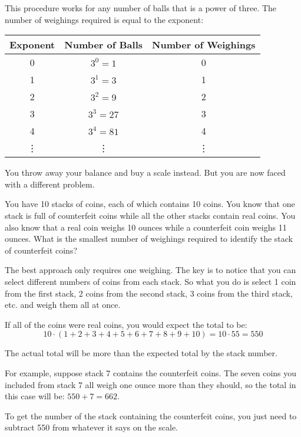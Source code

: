 \documentclass[fleqn,addpoints]{exam}
\begin{document}
\begin{questions}
\begin{solution}
\begin{itemize}
      \end{itemize}

      This procedure works for any number of balls that is a power of three.  The number of
      weighings required is equal to the exponent:

    \begin{center}
      \begin{tabular}{|c|c|c|}
        \hline
        Exponent & Number of Balls & Number of Weighings \\
        \hline
        0 & $3^0 = 1$ & 0 \\
        1 & $3^1 = 3$ & 1 \\
        2 & $3^2 = 9$ & 2 \\
        3 & $3^3 = 27$ & 3 \\
        4 & $3^4 = 81$ & 4 \\
        \vdots & \vdots & \vdots \\
        \hline

      \end{tabular}
    \end{center}

    \end{solution}

    \question

    You throw away your balance and buy a scale instead.  But you are now faced with a different problem.  

    You have 10 stacks of coins, each of which contains 10 coins.  You know that one stack is full
    of counterfeit coins while all the other stacks contain real coins.  You also know that a real
    coin weighs 10 ounces while a counterfeit coin weighs 11 ounces.  What is the smallest number of
    weighings required to identify the stack of counterfeit coins?

    \begin{solution}

    The best approach only requires one weighing.  The key is to notice that you can select
    different numbers of coins from each stack.  So what you do is select 1 coin from the first
    stack, 2 coins from the second stack, 3 coins from the third stack, etc. and weigh them all at
    once.

    If all of the coins were real coins, you would expect the total to be: 
    \[ 10 \cdot (1 + 2 + 3 + 4 + 5 + 6 + 7 + 8 + 9 + 10)  = 10 \cdot 55 = 550 \]

    The actual total will be more than the expected total by the stack number.  

    For example, suppose stack 7 contains the counterfeit coins.  The seven coins you included from
    stack 7 all weigh one ounce more than they should, so the total in this case will be: 
    $550 + 7 = 662$.

    To get the number of the stack containing the counterfeit coins, you just need to subtract 550
    from whatever it says on the scale.

    \end{solution}


  \end{questions}
\end{document}
